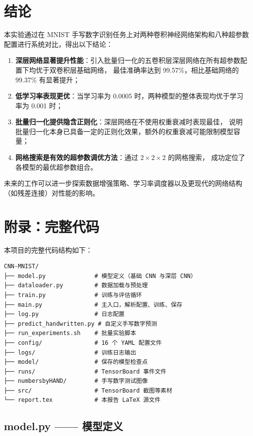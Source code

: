 \documentclass[UTF8,a4paper,12pt]{ctexart}
\begin{document}
\section{结论}

本实验通过在 MNIST 手写数字识别任务上对两种卷积神经网络架构和八种超参数配置进行系统对比，得出以下结论：

\begin{enumerate}
    \item \textbf{深层网络显著提升性能}：引入批量归一化的五卷积层深层网络在所有超参数配置下均优于双卷积层基础网络，
          最佳准确率达到 99.57\%，相比基础网络的 99.37\% 有显著提升；
    \item \textbf{低学习率表现更优}：当学习率为 0.0005 时，两种模型的整体表现均优于学习率为 0.001 时；
    \item \textbf{批量归一化提供隐含正则化}：深层网络在不使用权重衰减时表现最佳，
          说明批量归一化本身已具备一定的正则化效果，额外的权重衰减可能限制模型容量；
    \item \textbf{网格搜索是有效的超参数调优方法}：通过 $2\times2\times2$ 的网格搜索，
          成功定位了各模型的最优超参数组合。
\end{enumerate}

未来的工作可以进一步探索数据增强策略、学习率调度器以及更现代的网络结构（如残差连接）对性能的影响。

\appendix
\section{附录：完整代码}

本项目的完整代码结构如下：

\begin{verbatim}
CNN-MNIST/
├── model.py              # 模型定义（基础 CNN 与深层 CNN）
├── dataloader.py         # 数据加载与预处理
├── train.py              # 训练与评估循环
├── main.py               # 主入口，解析配置、训练、保存
├── log.py                # 日志配置
├── predict_handwritten.py # 自定义手写数字预测
├── run_experiments.sh    # 批量实验脚本
├── config/               # 16 个 YAML 配置文件
├── logs/                 # 训练日志输出
├── model/                # 保存的模型检查点
├── runs/                 # TensorBoard 事件文件
├── numbersbyHAND/        # 手写数字测试图像
├── src/                  # TensorBoard 截图等素材
└── report.tex            # 本报告 LaTeX 源文件
\end{verbatim}

\subsection{model.py —— 模型定义}
\end{document}
